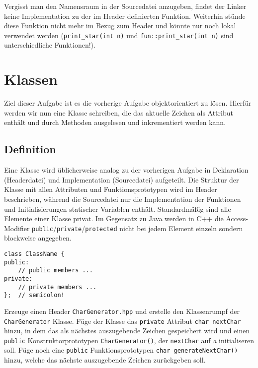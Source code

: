Vergisst man den Namensraum in der Sourcedatei anzugeben, findet der Linker keine Implementation zu der im Header definierten Funktion.
Weiterhin stünde diese Funktion nicht mehr im Bezug zum Header und könnte nur noch lokal verwendet werden (\texttt{print\_star(int n)} und \texttt{fun::print\_star(int n)} sind unterschiedliche Funktionen!).

\newpage
\section{Klassen}
Ziel dieser Aufgabe ist es die vorherige Aufgabe objektorientiert zu lösen. Hierfür werden wir nun eine Klasse schreiben, die das aktuelle Zeichen als Attribut enthält und durch Methoden ausgelesen und inkrementiert werden kann.

\subsection{Definition}
Eine Klasse wird üblicherweise analog zu der vorherigen Aufgabe in Deklaration (Headerdatei) und Implementation (Sourcedatei) aufgeteilt.
Die Struktur der Klasse mit allen Attributen und Funktionsprototypen wird im Header beschrieben, während die Sourcedatei nur die Implementation der Funktionen und Initialisierungen statischer Variablen enthält.
Standardmäßig sind alle Elemente einer Klasse privat.
Im Gegensatz zu Java werden in C++ die Access-Modifier \texttt{public}/\texttt{private}/\texttt{protected} nicht bei jedem Element einzeln sondern blockweise angegeben.
\begin{lstlisting}
class ClassName {
public:
	// public members ...
private:
	// private members ...
};	// semicolon!
\end{lstlisting}

Erzeuge einen Header \texttt{CharGenerator.hpp} und erstelle den Klassenrumpf der \texttt{CharGenerator} Klasse.
Füge der Klasse das \texttt{private} Attribut \texttt{char nextChar} hinzu, in dem das als nächstes auszugebende Zeichen gespeichert wird und einen \texttt{public} Konstruktorprototypen \texttt{CharGenerator()}, der \texttt{nextChar} auf \emph{a} initialiseren soll.
Füge noch eine \texttt{public} Funktionsprototypen \texttt{char generateNextChar()} hinzu, welche das nächste auszugebende Zeichen zurückgeben soll.



